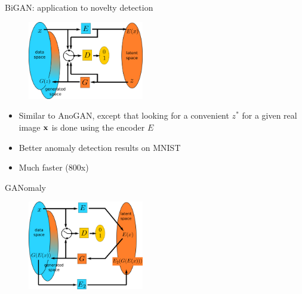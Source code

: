 \documentclass[xcolor=pdftex,dvipsnames,table,mathserif,aspectratio=169]{beamer}
\begin{document}
\begin{frame}{BiGAN: application to novelty detection~\tiny{\cite{zenati_efficient_2018}}}

  \begin{figure}[ht]
    \centering
    \includegraphics[width=0.45\textwidth]{bigan}
  \end{figure}

  \begin{itemize}
  \item Similar to AnoGAN, except that looking for a convenient $z^*$ for a given real image $\mathbf{x}$ is done using the encoder $E$
  \item Better anomaly detection results on MNIST
  \item Much faster (800x)
  \end{itemize}


\end{frame}








\begin{frame}{GANomaly~\tiny{\cite{akcay_ganomaly:_2019}}}

  \begin{figure}[ht]
    \centering
    \includegraphics[width=0.45\textwidth]{ganomaly}
  \end{figure}



\end{frame}
\end{document}
